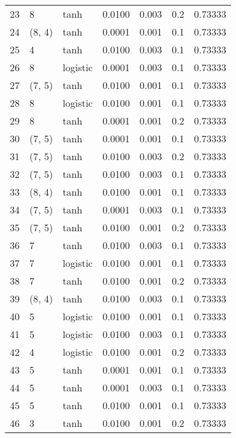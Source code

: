 \begin{tabular}{lllrrrr}
23  &           8 &      tanh &  0.0100 &  0.003 &  0.2 &   0.73333 \\
24  &      (8, 4) &      tanh &  0.0001 &  0.001 &  0.1 &   0.73333 \\
25  &           4 &      tanh &  0.0100 &  0.003 &  0.1 &   0.73333 \\
26  &           8 &  logistic &  0.0001 &  0.003 &  0.1 &   0.73333 \\
27  &      (7, 5) &      tanh &  0.0100 &  0.001 &  0.1 &   0.73333 \\
28  &           8 &  logistic &  0.0100 &  0.001 &  0.1 &   0.73333 \\
29  &           8 &      tanh &  0.0001 &  0.001 &  0.2 &   0.73333 \\
30  &      (7, 5) &      tanh &  0.0001 &  0.001 &  0.1 &   0.73333 \\
31  &      (7, 5) &      tanh &  0.0100 &  0.003 &  0.2 &   0.73333 \\
32  &      (7, 5) &      tanh &  0.0100 &  0.003 &  0.1 &   0.73333 \\
33  &      (8, 4) &      tanh &  0.0100 &  0.001 &  0.1 &   0.73333 \\
34  &      (7, 5) &      tanh &  0.0001 &  0.003 &  0.1 &   0.73333 \\
35  &      (7, 5) &      tanh &  0.0100 &  0.001 &  0.2 &   0.73333 \\
36  &           7 &      tanh &  0.0100 &  0.003 &  0.1 &   0.73333 \\
37  &           7 &  logistic &  0.0100 &  0.001 &  0.1 &   0.73333 \\
38  &           7 &      tanh &  0.0100 &  0.001 &  0.2 &   0.73333 \\
39  &      (8, 4) &      tanh &  0.0100 &  0.003 &  0.1 &   0.73333 \\
40  &           5 &  logistic &  0.0100 &  0.001 &  0.1 &   0.73333 \\
41  &           5 &  logistic &  0.0100 &  0.003 &  0.1 &   0.73333 \\
42  &           4 &  logistic &  0.0100 &  0.001 &  0.2 &   0.73333 \\
43  &           5 &      tanh &  0.0001 &  0.001 &  0.1 &   0.73333 \\
44  &           5 &      tanh &  0.0001 &  0.003 &  0.1 &   0.73333 \\
45  &           5 &      tanh &  0.0100 &  0.001 &  0.1 &   0.73333 \\
46  &           3 &      tanh &  0.0100 &  0.001 &  0.2 &   0.73333 \\

\end{tabular}
